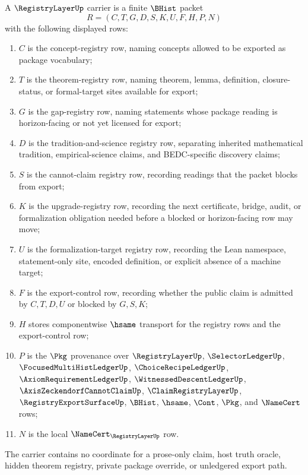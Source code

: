 \begin{definition}
\label{def:registry-layer-carrier}
A $\RegistryLayerUp$ carrier is a finite $\BHist$ packet
$$
R=(C,T,G,D,S,K,U,F,H,P,N)
$$
with the following displayed rows:
\begin{enumerate}
\item $C$ is the concept-registry row, naming concepts allowed to be exported as package vocabulary;
\item $T$ is the theorem-registry row, naming theorem, lemma, definition, closure-status, or formal-target sites available for export;
\item $G$ is the gap-registry row, naming statements whose package reading is horizon-facing or not yet licensed for export;
\item $D$ is the tradition-and-science registry row, separating inherited mathematical tradition, empirical-science claims, and BEDC-specific discovery claims;
\item $S$ is the cannot-claim registry row, recording readings that the packet blocks from export;
\item $K$ is the upgrade-registry row, recording the next certificate, bridge, audit, or formalization obligation needed before a blocked or horizon-facing row may move;
\item $U$ is the formalization-target registry row, recording the Lean namespace, statement-only site, encoded definition, or explicit absence of a machine target;
\item $F$ is the export-control row, recording whether the public claim is admitted by $C,T,D,U$ or blocked by $G,S,K$;
\item $H$ stores componentwise $\hsame$ transport for the registry rows and the export-control row;
\item $P$ is the $\Pkg$ provenance over $\RegistryLayerUp$, $\SelectorLedgerUp$, $\FocusedMultiHistLedgerUp$, $\ChoiceRecipeLedgerUp$, $\AxiomRequirementLedgerUp$, $\WitnessedDescentLedgerUp$, $\AxisZeckendorfCannotClaimUp$, $\ClaimRegistryLayerUp$, $\RegistryExportSurfaceUp$, $\BHist$, $\hsame$, $\Cont$, $\Pkg$, and $\NameCert$ rows;
\item $N$ is the local $\NameCert_{\RegistryLayerUp}$ row.
\end{enumerate}
The carrier contains no coordinate for a prose-only claim, host truth oracle, hidden theorem registry, private package override, or unledgered export path.
\end{definition}


